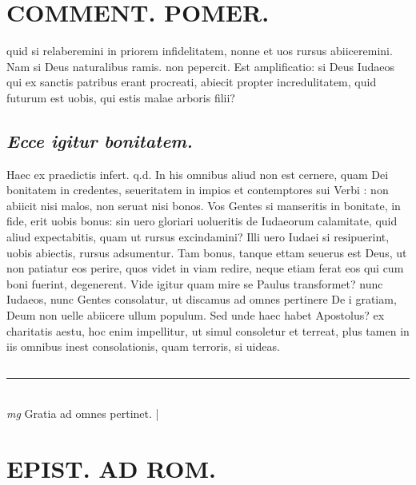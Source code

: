 \documentclass{article}
\begin{document}
\begin{pages}
\section*{COMMENT. POMER.  }\pstart quid si relaberemini in priorem infidelitatem, nonne et uos rursus abiiceremini.  \pend\pstart Nam si Deus naturalibus ramis. non pepercit.  \pend\pstart Est amplificatio: si Deus Iudaeos qui ex sanctis patribus erant procreati, abiecit propter incredulitatem, quid futurum est uobis, qui estis malae arboris filii?  \pend
{}
{}
\subsection*{\textit{Ecce igitur bonitatem. }}\pstart Haec ex praedictis infert. q.d. In his omnibus aliud non est cernere, quam Dei bonitatem in credentes, seueritatem in impios et contemptores sui Verbi : non abiicit nisi malos, non seruat nisi bonos. Vos Gentes si manseritis in bonitate, in fide, erit uobis bonus: sin uero gloriari uolueritis de Iudaeorum calamitate, quid aliud expectabitis, quam ut rursus excindamini? Illi uero Iudaei si resipuerint, uobis abiectis, rursus adsumentur. Tam bonus, tanque ettam seuerus est Deus, ut non patiatur eos perire, quos videt in viam redire, neque etiam ferat eos qui cum boni fuerint, degenerent. Vide igitur quam mire se Paulus transformet? nunc Iudaeos, nunc Gentes consolatur, ut discamus ad omnes pertinere De i gratiam, Deum non uelle abiicere ullum populum. Sed unde haec habet Apostolus? ex charitatis aestu, hoc enim impellitur, ut simul consoletur et terreat, plus tamen in iis omnibus inest consolationis, quam terroris, si uideas.   \pend
{}
{}
\subsection*{\textit{}}
\vspace{0.5cm}\noindent
\vspace{0.2cm}\rule{1cm}{0.2pt}\\ 
\hspace{0.2cm}\textit{mg}
\footnotesize Gratia ad omnes pertinet.  
\normalsize| 
\section*{EPIST. AD ROM.  }
\marginpar{[ p. ]}
{}

\end{pages}
\end{document}
